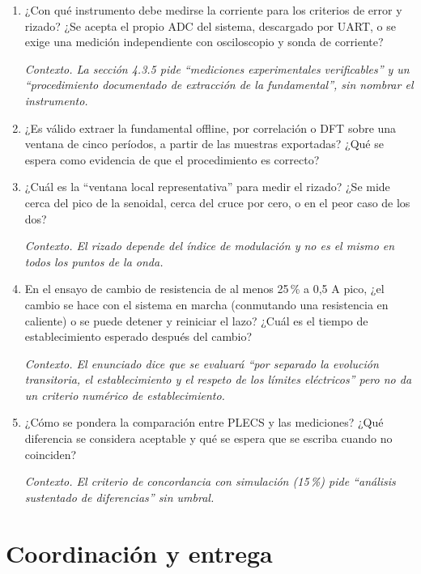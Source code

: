 \documentclass[11pt,a4paper]{article}
\newcommand{\ctx}[1]{\par\vspace{0.2em}\small\textit{Contexto. #1}\normalsize}
\begin{document}
\begin{enumerate}[resume]
  \item ¿Con qué instrumento debe medirse la corriente para los criterios de error y rizado? ¿Se acepta el propio ADC del sistema, descargado por UART, o se exige una medición independiente con osciloscopio y sonda de corriente?
  \ctx{La sección 4.3.5 pide ``mediciones experimentales verificables'' y un ``procedimiento documentado de extracción de la fundamental'', sin nombrar el instrumento.}

  \item ¿Es válido extraer la fundamental offline, por correlación o DFT sobre una ventana de cinco períodos, a partir de las muestras exportadas? ¿Qué se espera como evidencia de que el procedimiento es correcto?

  \item ¿Cuál es la ``ventana local representativa'' para medir el rizado? ¿Se mide cerca del pico de la senoidal, cerca del cruce por cero, o en el peor caso de los dos?
  \ctx{El rizado depende del índice de modulación y no es el mismo en todos los puntos de la onda.}

  \item En el ensayo de cambio de resistencia de al menos 25\,\% a 0,5 A pico, ¿el cambio se hace con el sistema en marcha (conmutando una resistencia en caliente) o se puede detener y reiniciar el lazo? ¿Cuál es el tiempo de establecimiento esperado después del cambio?
  \ctx{El enunciado dice que se evaluará ``por separado la evolución transitoria, el establecimiento y el respeto de los límites eléctricos'' pero no da un criterio numérico de establecimiento.}

  \item ¿Cómo se pondera la comparación entre PLECS y las mediciones? ¿Qué diferencia se considera aceptable y qué se espera que se escriba cuando no coinciden?
  \ctx{El criterio de concordancia con simulación (15\,\%) pide ``análisis sustentado de diferencias'' sin umbral.}
\end{enumerate}

\section{Coordinación y entrega}
\end{document}
